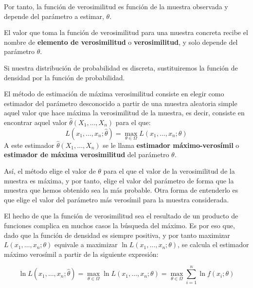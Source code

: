Por tanto, la funci\'on de verosimilitud es funci\'on de la muestra observada y depende del par\'ametro a estimar, $\theta$.

El valor que toma la funci\'on de verosimilitud para una muestra concreta recibe el nombre de \textbf{elemento de verosimilitud} o \textbf{verosimilitud}, y solo depende del par\'ametro $\theta$.

Si nuestra distribuci\'on de probabilidad es discreta, sustituiremos la funci\'on de densidad por la funci\'on de probabilidad.


\begin{definicion}
El m\'etodo de estimaci\'on de m\'axima verosimilitud consiste en elegir como estimador del par\'ametro desconocido a partir de una muestra aleatoria simple aquel valor que hace m\'axima la verosimilitud de la muestra, es decir, consiste en encontrar aquel valor $\hat{\theta}(X_1,\ldots,X_n)$ para el que:
\begin{equation*}
L(x_1,\ldots,x_n;\hat{\theta})=\max_{\theta\in\Omega}{L(x_1,\ldots,x_n;\theta)}
\end{equation*}
A este estimador $\hat{\theta}(X_1,\ldots,X_n)$ se le llama \textbf{estimador m\'aximo-veros\'imil} o \textbf{estimador de m\'axima verosimilitud} del par\'ametro $\theta$.
\end{definicion}

As\'i, el m\'etodo elige el valor de $\theta$ para el que el valor de la verosimilitud de la muestra es m\'axima, y por tanto, elige el valor del par\'ametro de forma que la muestra que hemos obtenido sea la m\'as probable. Otra forma de entenderlo es que elige el valor del par\'ametro m\'as veros\'imil para la muestra considerada.

El hecho de que la funci\'on de verosimilitud sea el resultado de un producto de funciones complica en muchos casos la b\'usqueda del m\'aximo. Es por eso que, dado que la funci\'on de densidad es siempre positiva, y por tanto maximizar $L(x_1,\ldots,x_n;\theta)$ equivale a maximizar $\ln{L(x_1,\ldots,x_n;\theta)}$, se calcula el estimador m\'aximo veros\'imil a partir de la siguiente expresi\'on:

\begin{equation*}
\ln{L(x_1,\ldots,x_n;\hat{\theta})}=\max_{\theta\in\Omega}{\ln{L(x_1,\ldots,x_n;\theta)}}=\max_{\theta\in\Omega}{\sum_{i=1}^n\ln{f(x_i;\theta)}}
\end{equation*}

